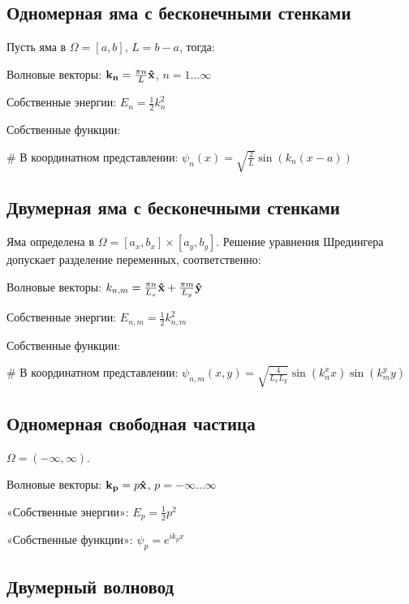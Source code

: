 \subsection{Одномерная яма с бесконечными стенками}
Пусть яма в $\Omega = [a, b]$, $L = b - a$, тогда:

Волновые векторы: $\vb{k_n} = \frac{\pi n}{L} \vb{\hat{x}}$, $n = 1 \dots \infty$

Собственные энергии: $E_n = \frac{1}{2} k_n^2$

Собственные функции:
\begin{ilist}
# В координатном представлении: $\psi_n(x) = \sqrt{\frac{2}{L}} \sin(k_n (x - a))$
\end{ilist}

\subsection{Двумерная яма с бесконечными стенками}
Яма определена в $\Omega = [a_x, b_x] \times [a_y, b_y]$. Решение уравнения Шредингера допускает разделение переменных, соответственно:

Волновые векторы: $k_{n, m} = \frac{\pi n}{L_x} \vb{\hat{x}} + \frac{\pi m}{L_y} \vb{\hat{y}}$

Собственные энергии: $E_{n, m} = \frac{1}{2} k_{n, m}^2$

Собственные функции: 
\begin{ilist}
# В координатном представлении: $\psi_{n, m}(x, y) = \sqrt{\frac{4}{L_x L_y}} \sin(k^x_n x) \sin(k^y_m y)$
\end{ilist}



\subsection{Одномерная свободная частица}
$\Omega = (-\infty, \infty)$. 

Волновые векторы: $\vb{k_{p}} = p \vb{\hat{x}}$, $p = -\infty \dots \infty$

«Собственные энергии»: $E_p = \frac{1}{2} p^2$

«Собственные функции»: $\psi_p = e^{i k_p x}$


\subsection{Двумерный волновод}
